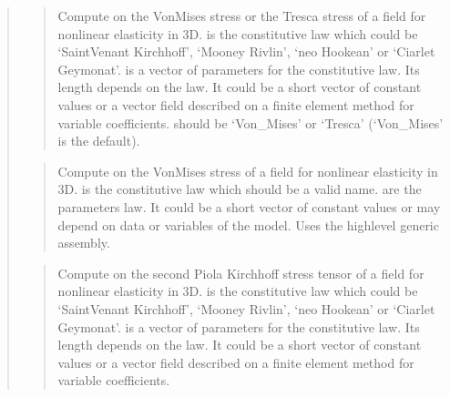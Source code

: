 \documentclass[a4paper,11pt,english]{sphinxmanual}
\begin{document}
\begin{quote}
\begin{quote}
\sphinxAtStartPar
Compute on  the Von\sphinxhyphen{}Mises stress or the Tresca stress of a field
for nonlinear elasticity in 3D.  is the constitutive law which
could be ‘SaintVenant Kirchhoff’, ‘Mooney Rivlin’, ‘neo Hookean’ or
‘Ciarlet Geymonat’.
 is a vector of parameters for the constitutive law. Its length
depends on the law. It could be a short vector of constant values or a
vector field described on a finite element method for variable coefficients.
 should be  ‘Von\_Mises’ or ‘Tresca’ (‘Von\_Mises’ is the default).
\end{quote}

\sphinxAtStartPar
{}
\begin{quote}

\sphinxAtStartPar
Compute on  the Von\sphinxhyphen{}Mises stress of a field 
for nonlinear elasticity in 3D.  is the constitutive law which
should be a valid name.  are the parameters law. It could be
a short vector of constant values or may depend on data or variables
of the model.
Uses the high\sphinxhyphen{}level generic assembly.
\end{quote}

\sphinxAtStartPar
{}
\begin{quote}

\sphinxAtStartPar
Compute on  the second Piola Kirchhoff stress tensor of a field
for nonlinear elasticity in 3D.  is the constitutive law which
could be ‘SaintVenant Kirchhoff’, ‘Mooney Rivlin’, ‘neo Hookean’ or
‘Ciarlet Geymonat’.
 is a vector of parameters for the constitutive law. Its length
depends on the law. It could be a short vector of constant values or a
vector field described on a finite element method for variable
coefficients.
\end{quote}

\sphinxAtStartPar
{}
\begin{quote}


\end{quote}
\end{quote}
\end{document}
